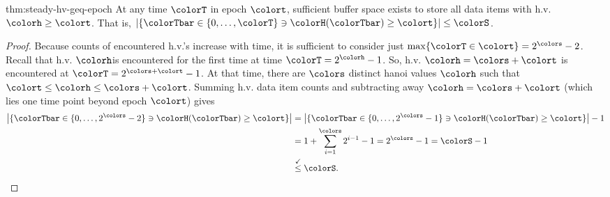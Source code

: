 \begin{lemma} \item{thm:steady-hv-geq-epoch}
At any time $\colorT$ in epoch $\colort$, sufficient buffer space exists to store all data items with h.v. $\colorh \geq \colort$.
That is, $\left| \{\colorTbar \in \{0, \ldots, \colorT \} \ni \colorH(\colorTbar) \geq \colort \} \right| \leq \colorS$.
\end{lemma}

\begin{proof}
Because counts of encountered h.v.'s increase with time, it is sufficient to consider just $\max\{\colorT \in \colort\} = 2^{\colors} - 2$.
Recall that h.v. $\colorh $is encountered for the first time at time $\colorT = 2^{\colorh} - 1$.
So, h.v. $\colorh = \colors + \colort$ is encountered at $\colorT = 2^{\colors + \colort} - 1$.
At that time, there are $\colors$ distinct hanoi values $\colorh$ such that $\colort \leq \colorh \leq \colors + \colort$.
Summing h.v. data item counts and subtracting away $\colorh = \colors + \colort$ (which lies one time point beyond epoch $\colort$) gives
\begin{align*}
\left| \{\colorTbar \in \{0, \ldots, 2^{\colors} - 2 \} \ni \colorH(\colorTbar) \geq \colort \} \right|
&= \left| \{\colorTbar \in \{0, \ldots, 2^{\colors} - 1 \} \ni \colorH(\colorTbar) \geq \colort \} \right| - 1\\
&= 1 + \sum_{i=1}^{\colors} 2^{i - 1} - 1 = 2^{\colors} - 1 = \colorS - 1\\
&\stackrel{\checkmark}{\leq} \colorS.
\end{align*}
\end{proof}
